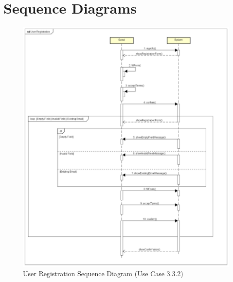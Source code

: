 \section{Sequence Diagrams}

\begin{figure}[H]
	\centering
	\includegraphics[width = \textwidth]{img/sequence1}
	\caption{User Registration Sequence Diagram (Use Case 3.3.2)}
\end{figure}

